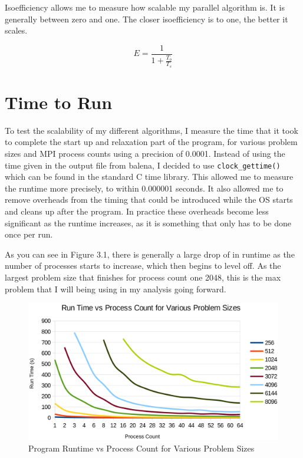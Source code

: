 \documentclass{report}
\begin{document}
Isoefficiency allows me to measure how scalable my parallel algorithm is. It is generally between zero and one. The closer isoefficiency is to one, the better it scales.\newline

$$E=\frac{1}{1+\frac{T_o}{T_s}}$$\newline
\section{Time to Run}
To test the scalability of my different algorithms, I measure the time that it took to complete the start up and relaxation part of the program, for various problem sizes and MPI process counts using a precision of 0.0001. Instead of using the time given in the output file from balena, I decided to use \lstinline[style=customc]|clock_gettime()|\lstinline[style=customc]|| which can be found in the standard C time library. This allowed me to measure the runtime more precisely, to within 0.000001 seconds. It also allowed me to remove overheads from the timing that could be introduced while the OS starts and cleans up after the program. In practice these overheads become less significant as the runtime increases, as it is something that only has to be done once per run.

As you can see in Figure 3.1, there is generally a large drop of in runtime as the number of processes starts to increase, which then begins to level off. As the largest problem size that finishes for process count one 2048, this is the max problem that I will being using in my analysis going forward.

\begin{figure}[h]
\includegraphics[width=1\textwidth]{Runtime}
\caption{Program Runtime vs Process Count for Various Problem Sizes}
\label{fig:subim3}
\end{figure}
\end{document}
